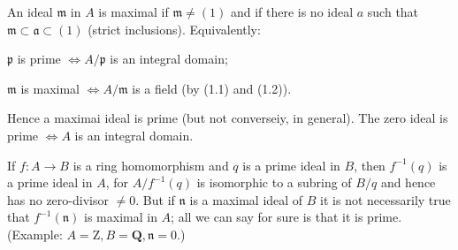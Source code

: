 \documentclass[class=book, crop=false]{standalone}
\theoremstyle{definition}
\theoremstyle{remark}
\begin{document}
An ideal $\mathfrak{m}$ in $A$ is maximal if $\mathfrak{m} \neq(1)$ and if there
is no ideal $a$ such that $\mathfrak{m} \subset \mathfrak{a} \subset(1)$ (strict
inclusions). Equivalently:

$\mathfrak{p}$ is prime $\iff A / \mathfrak{p}$ is an integral
domain;

$\mathfrak{m}$ is maximal $\iff A / \mathfrak{m}$ is a field (by
(1.1) and (1.2)).

Hence a maximai ideal is prime (but not converseiy, in general). The zero ideal
is prime $\iff A$ is an integral domain.

If $f: A \to B$ is a ring homomorphism and $q$ is a prime ideal in $B$, then
$f^{-1}(q)$ is a prime ideal in $A$, for $A / f^{-1}(q)$ is isomorphic to a
subring of $B / q$ and hence has no zero-divisor $\neq 0$. But if $\mathfrak{n}$
is a maximal ideal of $B$ it is not necessarily true that $f^{-1}(\mathfrak{n})$
is maximal in $A$; all we can say for sure is that it is prime. (Example:
$A=\mathrm{Z}, B=\mathbf{Q}, \mathfrak{n}=0$.)
\end{document}
